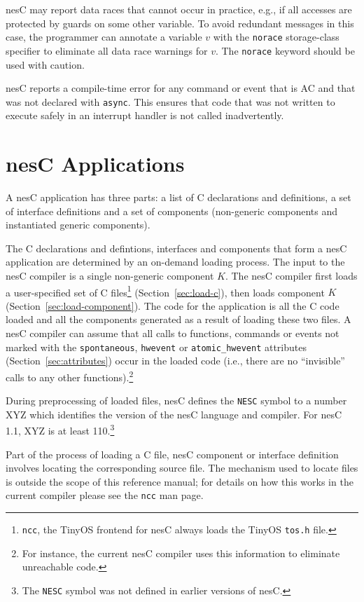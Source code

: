 \documentclass[11pt,letterpaper]{article}
\newcommand{\kw}[1]{{\tt #1}}
\newcommand{\code}[1]{{\tt #1}}
\newcommand{\file}[1]{{\tt #1}}
\newcommand{\nesc}{nesC\xspace}
\begin{document}
\nesc may report data races that cannot occur in practice, e.g., if all
accesses are protected by guards on some other variable. To avoid redundant
messages in this case, the programmer can annotate a variable $v$ with the
\kw{norace} storage-class specifier to eliminate all data race warnings for
$v$. The \kw{norace} keyword should be used with caution.

\nesc reports a compile-time error for any command or event that is AC and
that was not declared with \kw{async}. This ensures that code that was not
written to execute safely in an interrupt handler is not called
inadvertently.

\section{\nesc Applications}
\label{sec:app}

A \nesc application has three parts: a list of C declarations and
definitions, a set of interface definitions and a set of components
(non-generic components and instantiated generic components).

The C declarations and defintions, interfaces and components that form
a \nesc application are determined by an on-demand loading process. The
input to the \nesc compiler is a single non-generic component $K$. The
\nesc compiler first loads a user-specified set of C
files\footnote{\kw{ncc}, the TinyOS frontend for \nesc always loads the
TinyOS \file{tos.h} file.} (Section~\ref{sec:load-c}), then loads component
$K$ (Section~\ref{sec:load-component}). The code for the application is all
the C code loaded and all the components generated as a result of loading
these two files. A \nesc compiler can assume that all calls to functions,
commands or events not marked with the \code{spontaneous}, \code{hwevent}
or \code{atomic\_hwevent} attributes (Section~\ref{sec:attributes}) occur
in the loaded code (i.e., there are no ``invisible'' calls to any other
functions).\footnote{For instance, the current \nesc compiler uses this
information to eliminate unreachable code.}

During preprocessing of loaded files, \nesc defines the \kw{NESC} symbol to
a number XYZ which identifies the version of the \nesc language and compiler.
For \nesc 1.1, XYZ is at least 110.\footnote{The \kw{NESC} symbol was not
defined in earlier versions of \nesc.}

Part of the process of loading a C file, \nesc component or interface
definition involves locating the corresponding source file. The mechanism
used to locate files is outside the scope of this reference manual; for
details on how this works in the current compiler please see the \file{ncc}
man page.
\end{document}
